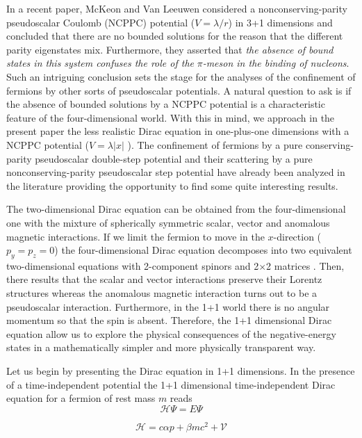 \documentclass[a4paper,12pt,titlepage]{article}
\begin{document}
In a recent paper, McKeon and Van Leeuwen \cite{mck} considered a
non\-con\-ser\-ving-parity pseu\-do\-sca\-lar Coulomb (NCPPC) potential ($%
V=\lambda /r$) in 3+1 dimensions and concluded that there are no bounded
solutions for the reason that the different parity eigenstates mix.
Furthermore, they asserted that \textit{the absence of bound states in this
system confuses the role of the }$\pi $\textit{-meson in the binding of
nucleons}. Such an intriguing conclusion sets the stage for the analyses of
the confinement of fermions by other sorts of pseudoscalar potentials. A
natural question to ask is if the absence of bounded solutions by a NCPPC
potential is a characteristic feature of the four-dimensional world. With
this in mind, we approach in the present paper the less realistic Dirac
equation in one-plus-one dimensions with a NCPPC potential ($V=\lambda |x|$%
). The confinement of fermions by a pure \-con\-ser\-ving-parity
pseudoscalar double-step potential \cite{asc2} and their scattering by a
pure non\-con\-ser\-ving-parity pseudoscalar step potential \cite{asc3} have
already been analyzed in the literature providing the opportunity to find
some quite interesting results.

The two-dimensional Dirac equation can be obtained from the
four-dimen\-sional one with the mixture of spherically symmetric scalar,
vector and anomalous magnetic interactions. If we limit the fermion to move
in the $x$-direction ($p_{y}=p_{z}=0$) the four-dimensional Dirac equation
decomposes into two equivalent two-dimensional equations with 2-component
spinors and 2$\times $2 matrices \cite{str}. Then, there results that the
scalar and vector interactions preserve their Lorentz structures whereas the
anomalous magnetic interaction turns out to be a pseudoscalar interaction.
Furthermore, in the 1+1 world there is no angular momentum so that the spin
is absent. Therefore, the 1+1 dimensional Dirac equation allow us to explore
the physical consequences of the negative-energy states in a mathematically
simpler and more physically transparent way.

Let us begin by presenting the Dirac equation in 1+1 dimensions. In the
presence of a time-independent potential the 1+1 dimensional
time-independent Dirac equation for a fermion of rest mass $m$ reads 
\begin{equation}
\mathcal{H}\Psi =E\Psi  \label{eq1}
\end{equation}

\begin{equation}
\mathcal{H}=c\alpha p+\beta mc^{2}+\mathcal{V}  \label{eq1a}
\end{equation}
\end{document}
